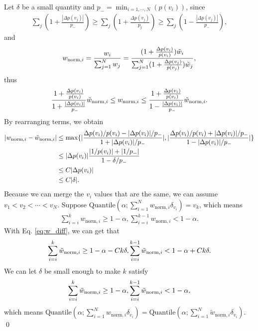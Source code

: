 Let $\delta$ be a small quantity and $p_-=\min_{i=1,\cdots,N}(p(v_i))$, since
\begin{align}
    \sum_j(1+\frac{|\Delta p(v_j)|}{p_-})\geq\sum_j(1+\frac{\Delta p(v_j)}{p_j})\geq\sum_j(1-\frac{|\Delta p(v_j)|}{p_-}),
\end{align}
and 
\begin{align}
    w_{\textrm{norm},i}=\frac{w_i}{\sum_{j=1}^N w_j}=\frac{(1+\frac{\Delta p(v_i)}{p(v_i)})\Tilde{w}_i}{\sum_{j=1}^N(1+\frac{\Delta p(v_j)}{p(v_j)})\Tilde{w}_j},
\end{align}
thus
\begin{align}
    \frac{1+\frac{\Delta p(v_i)}{p(v_i)}}{1+\frac{|\Delta p(v_i)|}{p_-}}\Tilde{w}_{\textrm{norm},i}\leq w_{\textrm{norm},i}\leq\frac{1+\frac{\Delta p(v_i)}{p(v_i)}}{1-\frac{|\Delta p(v_i)|}{p_-}}\Tilde{w}_{\textrm{norm},i}.
\end{align}
By rearranging terms, we obtain
\begin{align}
    |w_{\textrm{norm},i}-\Tilde{w}_{\textrm{norm},i}|
    &\leq\max\{|\frac{\Delta p(v_i)/p(v_i)-|\Delta p(v_i)|/p_-}{1+|\Delta p(v_i)|/p_-}|, |\frac{\Delta p(v_i)/p(v_i)+|\Delta p(v_i)|/p_-}{1-|\Delta p(v_i)|/p_-}| \} \\
    &\leq|\Delta p(v_i)|\frac{|1/p(v_i)|+|1/p_-|}{1-\delta/p_-} \\
    &\leq C|\Delta p(v_i)| \\
    &\leq C|\delta|. \label{eq:w_diff}
\end{align}
Because we can merge the $v_i$ values that are the same, we can assume $v_1<v_2<\cdots<v_N$. Suppose $\textrm{Quantile}(\alpha;\sum_{i=1}^N w_{\textrm{norm},i}\delta_{v_i})=v_k$, which means
\begin{align}
    \sum_{i=i}^k w_{\textrm{norm},i}\geq1-\alpha, \sum_{i=i}^{k-1} w_{\textrm{norm},i}<1-\alpha.
\end{align}
With Eq. \ref{eq:w_diff}, we can get that
\begin{align}
    \sum_{i=i}^k \Tilde{w}_{\textrm{norm},i}\geq1-\alpha-Ck\delta, \sum_{i=i}^{k-1} \Tilde{w}_{\textrm{norm},i}<1-\alpha+Ck\delta.
\end{align}
We can let $\delta$ be small enough to make $k$ satisfy
\begin{align}
    \sum_{i=i}^k \Tilde{w}_{\textrm{norm},i}\geq1-\alpha, \sum_{i=i}^{k-1} \Tilde{w}_{\textrm{norm},i}<1-\alpha,
\end{align}
which means $\textrm{Quantile}(\alpha;\sum_{i=1}^N w_{\textrm{norm},i}\delta_{v_i})=\textrm{Quantile}(\alpha;\sum_{i=1}^N \tilde{w}_{\textrm{norm},i}\delta_{v_i})$. \qed


